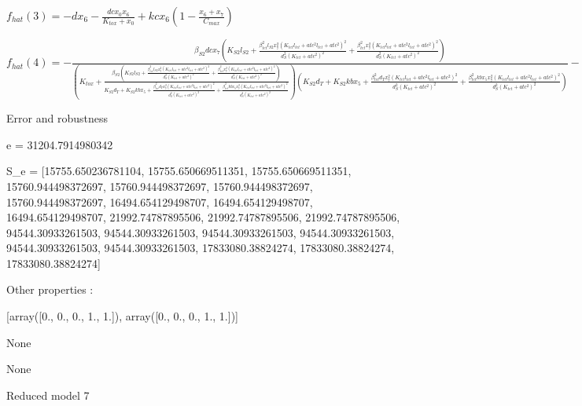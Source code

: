$f_{hat}(3)=- d x_{6} - \frac{dc x_{0} x_{6}}{K_{tox} + x_{0}} + kc x_{6} \left(1 - \frac{x_{6} + x_{7}}{C_{max}}\right)$


$f_{hat}(4)=- \frac{\beta_{S2} dc x_{7} \left(K_{S2} l_{S2} + \frac{\beta_{tet}^{2} l_{S2} x_{7}^{2} \left(K_{tet} l_{tet} + atc^{2} l_{tet} + atc^{2}\right)^{2}}{d_{S}^{2} \left(K_{tet} + atc^{2}\right)^{2}} + \frac{\beta_{tet}^{2} x_{7}^{2} \left(K_{tet} l_{tet} + atc^{2} l_{tet} + atc^{2}\right)^{2}}{d_{S}^{2} \left(K_{tet} + atc^{2}\right)^{2}}\right)}{\left(K_{tox} + \frac{\beta_{S2} \left(K_{S2} l_{S2} + \frac{\beta_{tet}^{2} l_{S2} x_{7}^{2} \left(K_{tet} l_{tet} + atc^{2} l_{tet} + atc^{2}\right)^{2}}{d_{S}^{2} \left(K_{tet} + atc^{2}\right)^{2}} + \frac{\beta_{tet}^{2} x_{7}^{2} \left(K_{tet} l_{tet} + atc^{2} l_{tet} + atc^{2}\right)^{2}}{d_{S}^{2} \left(K_{tet} + atc^{2}\right)^{2}}\right)}{K_{S2} d_{T} + K_{S2} kb x_{5} + \frac{\beta_{tet}^{2} d_{T} x_{7}^{2} \left(K_{tet} l_{tet} + atc^{2} l_{tet} + atc^{2}\right)^{2}}{d_{S}^{2} \left(K_{tet} + atc^{2}\right)^{2}} + \frac{\beta_{tet}^{2} kb x_{5} x_{7}^{2} \left(K_{tet} l_{tet} + atc^{2} l_{tet} + atc^{2}\right)^{2}}{d_{S}^{2} \left(K_{tet} + atc^{2}\right)^{2}}}\right) \left(K_{S2} d_{T} + K_{S2} kb x_{5} + \frac{\beta_{tet}^{2} d_{T} x_{7}^{2} \left(K_{tet} l_{tet} + atc^{2} l_{tet} + atc^{2}\right)^{2}}{d_{S}^{2} \left(K_{tet} + atc^{2}\right)^{2}} + \frac{\beta_{tet}^{2} kb x_{5} x_{7}^{2} \left(K_{tet} l_{tet} + atc^{2} l_{tet} + atc^{2}\right)^{2}}{d_{S}^{2} \left(K_{tet} + atc^{2}\right)^{2}}\right)} - d x_{7} + kc x_{7} \left(1 - \frac{x_{6} + x_{7}}{C_{max}}\right)$



Error and robustness 


e = 31204.7914980342

S_e = [15755.650236781104, 15755.650669511351, 15755.650669511351, 15760.944498372697, 15760.944498372697, 15760.944498372697, 15760.944498372697, 16494.654129498707, 16494.654129498707, 16494.654129498707, 21992.74787895506, 21992.74787895506, 21992.74787895506, 94544.30933261503, 94544.30933261503, 94544.30933261503, 94544.30933261503, 94544.30933261503, 94544.30933261503, 17833080.38824274, 17833080.38824274, 17833080.38824274]

Other properties :


[array([0., 0., 0., 1., 1.]), array([0., 0., 0., 1., 1.])]

None

None

Reduced model 7

